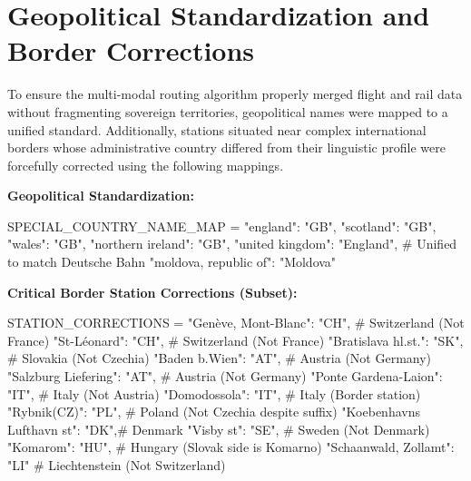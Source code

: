 \section{Geopolitical Standardization and Border Corrections}
\label{subsec:appendix-c-geopolitical-corrections}

To ensure the multi-modal routing algorithm properly merged flight and rail data without fragmenting sovereign territories, geopolitical names were mapped to a unified standard. Additionally, stations situated near complex international borders whose administrative country differed from their linguistic profile were forcefully corrected using the following mappings.

\medskip
\textbf{Geopolitical Standardization:}

\begin{appendixcode}
SPECIAL_COUNTRY_NAME_MAP = {
    "england": "GB",
    "scotland": "GB",
    "wales": "GB",
    "northern ireland": "GB",
    "united kingdom": "England", # Unified to match Deutsche Bahn
    "moldova, republic of": "Moldova"
}
\end{appendixcode}

\medskip
\textbf{Critical Border Station Corrections (Subset):}

\begin{appendixcode}
STATION_CORRECTIONS = {
    "Gen\`eve, Mont-Blanc": "CH",   # Switzerland (Not France)
    "St-L\'eonard": "CH",           # Switzerland (Not France)
    "Bratislava hl.st.": "SK",      # Slovakia (Not Czechia)
    "Baden b.Wien": "AT",           # Austria (Not Germany)
    "Salzburg Liefering": "AT",     # Austria (Not Germany)
    "Ponte Gardena-Laion": "IT",    # Italy (Not Austria)
    "Domodossola": "IT",            # Italy (Border station)
    "Rybnik(CZ)": "PL",             # Poland (Not Czechia despite suffix)
    "Koebenhavns Lufthavn st": "DK",# Denmark
    "Visby st": "SE",               # Sweden (Not Denmark)
    "Komarom": "HU",                # Hungary (Slovak side is Komarno)
    "Schaanwald, Zollamt": "LI"     # Liechtenstein (Not Switzerland)
}
\end{appendixcode}

